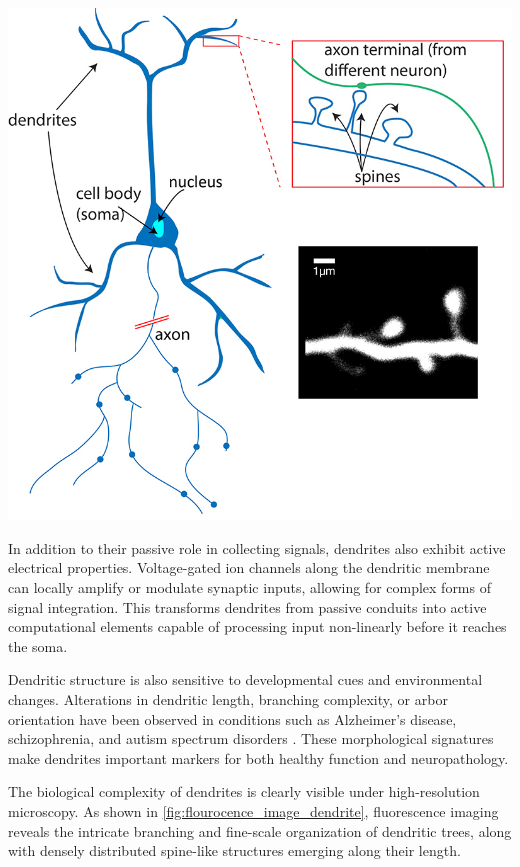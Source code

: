 \begin{center}
    \includegraphics[width=.6\textwidth]{figures/02_dendrite_structure.jpg} 
    \label{fig:dendrite_structure}
\end{center}

In addition to their passive role in collecting signals, dendrites also exhibit active electrical properties. Voltage-gated ion channels along the dendritic membrane can locally amplify or modulate synaptic inputs, allowing for complex forms of signal integration. This transforms dendrites from passive conduits into active computational elements capable of processing input non-linearly before it reaches the soma.

Dendritic structure is also sensitive to developmental cues and environmental changes. Alterations in dendritic length, branching complexity, or arbor orientation have been observed in conditions such as Alzheimer's disease, schizophrenia, and autism spectrum disorders \cite{Frank_2018}. These morphological signatures make dendrites important markers for both healthy function and neuropathology.

The biological complexity of dendrites is clearly visible under high-resolution microscopy. As shown in \autoref{fig:flourocence_image_dendrite}, fluorescence imaging reveals the intricate branching and fine-scale organization of dendritic trees, along with densely distributed spine-like structures emerging along their length.

